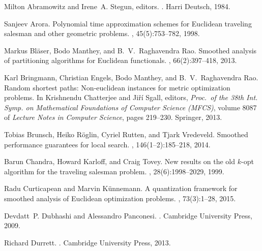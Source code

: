 \documentclass[11pt,DIV=12,a4paper]{scrartcl}
\begin{document}
\begin{thebibliography}{10}

Milton Abramowitz and Irene~A. Stegun, editors.
.
\newblock Harri Deutsch, 1984.

Sanjeev Arora.
\newblock Polynomial time approximation schemes for {E}uclidean traveling
  salesman and other geometric problems.
, 45(5):753--782, 1998.

Markus Bl{\"a}ser, Bodo Manthey, and B.~V.~Raghavendra Rao.
\newblock Smoothed analysis of partitioning algorithms for {Euclidean}
  functionals.
, 66(2):397--418, 2013.

Karl Bringmann, Christian Engels, Bodo Manthey, and B.~V.~Raghavendra Rao.
\newblock Random shortest paths: Non-euclidean instances for metric
  optimization problems.
\newblock In Krishnendu Chatterjee and Ji{\v{r}}{\'i} Sgall, editors, {\em
  Proc.\ of the 38th Int. Symp. on Mathematical Foundations of Computer Science
  (MFCS)}, volume 8087 of {\em Lecture Notes in Computer Science}, pages
  219--230. Springer, 2013.

Tobias Brunsch, Heiko R{\"o}glin, Cyriel Rutten, and Tjark Vredeveld.
\newblock Smoothed performance guarantees for local search.
, 146(1--2):185--218, 2014.

Barun Chandra, Howard Karloff, and Craig Tovey.
\newblock New results on the old $k$-opt algorithm for the traveling salesman
  problem.
, 28(6):1998--2029, 1999.

Radu Curticapean and Marvin K{\"u}nnemann.
\newblock A quantization framework for smoothed analysis of {E}uclidean
  optimization problems.
, 73(3):1--28, 2015.

Devdatt~P. Dubhashi and Alessandro Panconesi.
.
\newblock Cambridge University Press, 2009.

Richard Durrett.
.
\newblock Cambridge University Press, 2013.


\end{thebibliography}
\end{document}
